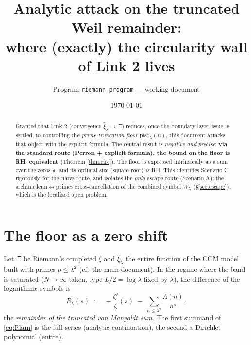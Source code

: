 \documentclass[11pt]{article}
\title{\textbf{Analytic attack on the truncated Weil remainder:\\
where (exactly) the circularity wall of Link 2 lives}}
\author{Program \texttt{riemann-program} --- working document}
\date{\today}
\theoremstyle{plain}
\theoremstyle{definition}
\newcommand{\xih}{\widehat{\xi}}
\newcommand{\Lam}{\Lambda}
\begin{document}
\maketitle

\begin{abstract}
Granted that Link 2 (convergence $\xih_{\lambda}\to\Xi$) reduces, once the
boundary-layer issue is settled, to controlling the \emph{prime-truncation floor}
$\mathrm{piso}_\lambda(n)$, this document attacks that object with the explicit
formula. The central result is \emph{negative and precise}:
\textbf{via the standard route (Perron + explicit formula), the bound on the floor is
RH--equivalent} (Theorem \ref{thm:circ}). The floor is expressed intrinsically as
a sum over the zeros $\rho$, and its optimal size (square root) \emph{is}
RH. This identifies Scenario C rigorously for the naive route, and isolates
the \emph{only} escape route (Scenario A): the archimedean$\leftrightarrow$primes
cross-cancellation of the combined symbol $W_\lambda$
(\S\ref{sec:escape}), which is the localized open problem.
\end{abstract}

\tableofcontents

\section{The floor as a zero shift}\label{sec:shift}

Let $\Xi$ be Riemann's completed $\xi$ and $\xih_\lambda$ the entire function of the
CCM model built with primes $p\le\lambda^2$ (cf.\ the main document). In the
regime where the band is saturated ($N\to\infty$ taken, type $L/2=\log\lambda$
fixed by $\lambda$), the difference of the logarithmic symbols is
\begin{equation}\label{eq:Rlam}
  R_\lambda(s)\;:=\;-\frac{\zeta'}{\zeta}(s)\;-\;\sum_{n\le\lambda^2}\frac{\Lam(n)}{n^{s}},
\end{equation}
the \emph{remainder of the truncated von Mangoldt sum}. The first summand of
\eqref{eq:Rlam} is the full series (analytic continuation), the second a
Dirichlet polynomial (entire).
\end{document}
